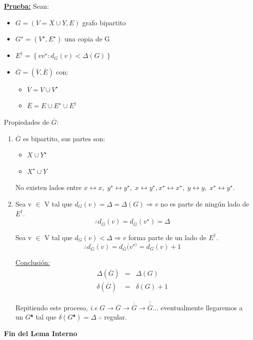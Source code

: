 \documentclass[12pt,a4paper]{report}
\begin{document}
				\underline{\textbf{Prueba:}} Sean:
					\begin{itemize}
						\item $G = (V = X \cup Y, E)$ grafo bipartito
						\item $G^{\star} = (V^{\star}, E^{\star})$ una copia de G
						\item $E^{\dag} = \left\lbrace vv^{\star} : d_{G}(v) < \Delta(G) \right\rbrace$
						\item $\overline{G} = (\overline{V}, \overline{E})$ con:
							\begin{itemize}
								\item $\overline{V} = V \cup V^{\star}$
								\item $\overline{E} = E \cup E^{\star} \cup E^{\dag}$
							\end{itemize}
					\end{itemize}

					\par Propiedades de $\overline{G}$:
					\begin{enumerate}
						\item $\overline{G}$ es bipartito, sus partes son:
							\begin{itemize}
								\item $X \cup Y^{\star}$
								\item $X^{\star} \cup Y$
							\end{itemize}
							\par No existen lados entre $x \leftrightarrow x, \; y^{\star} \leftrightarrow y^{\star}, \; x \leftrightarrow y^{\star}, x^{\star} \leftrightarrow x^{\star}, \; y \leftrightarrow y, \; x^{\star} \leftrightarrow y^{\star}$.

						\item Sea v $\in$ V tal que $d_{G}(v) = \Delta = \Delta(G) \Rightarrow v$ no es parte de ningún lado de $E^{\dag}$.
							\[
								\therefore d_{\overline{G}}(v) = d_{\overline{G}}(v^{\star}) = \Delta
							\]

							\vspace{5mm}
							\par Sea v $\in$ V tal que $d_{G}(v) < \Delta \Rightarrow v$ forma parte de un lado de $E^{\dag}$.
							\[
								\therefore d_{\overline{G}}(v) = d_{\overline{G}}(v^{\star)} = d_{G}(v) + 1
							\]
							
							\vspace{5mm}
							\par \underline{Conclusión:}
							\begin{eqnarray}
								\nonumber \Delta(\overline{G}) &=& \Delta(G) \\
								\nonumber \delta(\overline{G}) &=& \delta(G) + 1
							\end{eqnarray}
							\par Repitiendo este proceso, \textit{i.e} $G \rightarrow \overline{G} \rightarrow \overline{\overline{G}} \rightarrow \overline{\overline{\overline{G}}} \dotsc $ eventualmente llegaremos a un $G^{\blacktriangle}$ tal que $\delta(G^{\blacktriangle}) = \Delta \; \therefore $ regular.
					\end{enumerate}
			\par 	\textbf{Fin del Lema Interno}
\end{document}

